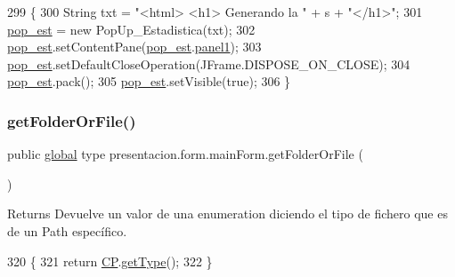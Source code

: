 \begin{DoxyCode}
299                                                  \{
300         String txt = \textcolor{stringliteral}{"<html> <h1> Generando la "} + s + \textcolor{stringliteral}{"</h1>"};
301         \hyperlink{classpresentacion_1_1form_1_1mainForm_ae04f75ed65fa9e0347f645e877f6eb95}{pop\_est} = \textcolor{keyword}{new} PopUp\_Estadistica(txt);
302         \hyperlink{classpresentacion_1_1form_1_1mainForm_ae04f75ed65fa9e0347f645e877f6eb95}{pop\_est}.setContentPane(\hyperlink{classpresentacion_1_1form_1_1mainForm_ae04f75ed65fa9e0347f645e877f6eb95}{pop\_est}.\hyperlink{classpresentacion_1_1form_1_1PopUp__Estadistica_ac276266d42b873f89883dd3a869feadf}{panel1});
303         \hyperlink{classpresentacion_1_1form_1_1mainForm_ae04f75ed65fa9e0347f645e877f6eb95}{pop\_est}.setDefaultCloseOperation(JFrame.DISPOSE\_ON\_CLOSE);
304         \hyperlink{classpresentacion_1_1form_1_1mainForm_ae04f75ed65fa9e0347f645e877f6eb95}{pop\_est}.pack();
305         \hyperlink{classpresentacion_1_1form_1_1mainForm_ae04f75ed65fa9e0347f645e877f6eb95}{pop\_est}.setVisible(\textcolor{keyword}{true});
306     \}
\end{DoxyCode}
\mbox{\label{classpresentacion_1_1form_1_1mainForm_af6d62b4914fbc44469a3c173e0472c43}} 
\subsubsection{\texorpdfstring{get\+Folder\+Or\+File()}{getFolderOrFile()}}
{\footnotesize\ttfamily public \hyperlink{classglobal_1_1global}{global} type presentacion.\+form.\+main\+Form.\+get\+Folder\+Or\+File (\begin{DoxyParamCaption}{ }\end{DoxyParamCaption})\hspace{0.3cm}{\ttfamily [inline]}}

\begin{DoxyReturn}{Returns}
Devuelve un valor de una enumeration diciendo el tipo de fichero que es de un Path específico. 
\end{DoxyReturn}

\begin{DoxyCode}
320                                          \{
321         \textcolor{keywordflow}{return} \hyperlink{classpresentacion_1_1form_1_1mainForm_a4d01396f002d4f9bd18db3877057c77b}{CP}.\hyperlink{classpresentacion_1_1Ctrl__Presentacio_1_1Ctrl__Presentacio_a029db5d77bf1e81be0811816a74d81a0}{getType}();
322     \}
\end{DoxyCode}
\mbox{\label{classpresentacion_1_1form_1_1mainForm_ac6348f8bdef39bfa651f145c00664320}} 
